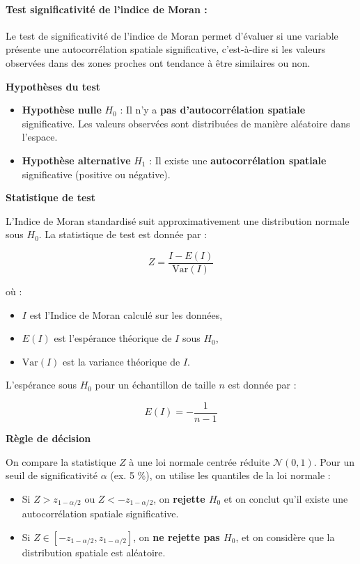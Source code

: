 \documentclass[
]{article}
\begin{document}
\paragraph{Test significativité de l'indice de Moran
:}\label{test-significativituxe9-de-lindice-de-moran}

Le test de significativité de l'indice de Moran permet d'évaluer si une
variable présente une autocorrélation spatiale significative,
c'est-à-dire si les valeurs observées dans des zones proches ont
tendance à être similaires ou non.

\textbf{Hypothèses du test}

\begin{itemize}
    \item \textbf{Hypothèse nulle} \( H_0 \) : Il n’y a \textbf{pas d’autocorrélation spatiale} significative. Les valeurs observées sont distribuées de manière aléatoire dans l’espace.
    \item \textbf{Hypothèse alternative} \( H_1 \) : Il existe une \textbf{autocorrélation spatiale} significative (positive ou négative).
\end{itemize}

\textbf{Statistique de test}

L'Indice de Moran standardisé suit approximativement une distribution
normale sous \(H_0\). La statistique de test est donnée par :

\[
    Z = \frac{I - E(I)}{\text{Var}(I)}
\]

où :

\begin{itemize}
    \item \( I \) est l’Indice de Moran calculé sur les données,
    \item \( E(I) \) est l’espérance théorique de \( I \) sous \( H_0 \),
    \item \( \text{Var}(I) \) est la variance théorique de \( I \).
\end{itemize}

L'espérance sous \(H_0\) pour un échantillon de taille \(n\) est donnée
par :

\[
    E(I) = -\frac{1}{n - 1}
\]

\textbf{Règle de décision}

On compare la statistique \(Z\) à une loi normale centrée réduite
\(\mathcal{N}(0,1)\). Pour un seuil de significativité \(\alpha\) (ex. 5
\%), on utilise les quantiles de la loi normale :

\begin{itemize}
    \item Si \( Z > z_{1-\alpha/2} \) ou \( Z < -z_{1-\alpha/2} \), on \textbf{rejette \( H_0 \)} et on conclut qu’il existe une autocorrélation spatiale significative.
    \item Si \( Z \in [-z_{1-\alpha/2}, z_{1-\alpha/2}] \), on \textbf{ne rejette pas \( H_0 \)}, et on considère que la distribution spatiale est aléatoire.
\end{itemize}
\end{document}
